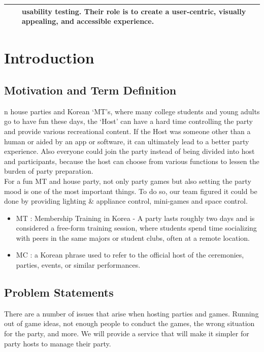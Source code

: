 \documentclass[conference]{IEEEtran}
\begin{document}
\begin{table}[htbp]
     \begin{tabular}{|p{1cm}|p{1.7cm}|p{5cm}|}
     \hline
     & &
    usability testing. Their role is to create a user-centric, visually appealing, and accessible experience.\\
     \hline
\end{tabular}
\end{table}

\section{Introduction}

    \subsection{Motivation and Term Definition}
        n house parties and Korean ‘MT’s, where many college students and young adults go to have fun these days, the ‘Host’ can  have a hard time controlling the party and provide various recreational content. If the Host was someone other than a human or aided by an app or software, it can ultimately lead to a better party experience. Also everyone could join the party instead of being divided into host and participants, because the host can choose from various functions to lessen the burden of party preparation.\\
    	For a fun MT and house party, not only party games but also setting the party mood is one of the most important things. To do so, our team figured it could be done by providing lighting \& appliance control, mini-games and space control.
        \begin{itemize}
            \item MT : Membership Training in Korea - A party lasts roughly two days and is considered a free-form training session, where students spend time socializing with peers in the same majors or student clubs, often at a remote location.
            \item MC : a Korean phrase used to refer to the official host of the ceremonies, parties, events, or similar performances.
        \end{itemize}

    \subsection{Problem Statements}
        There are a number of issues that arise when hosting parties and games. Running out of game ideas, not enough people to conduct the games, the wrong situation for the party, and more. We will provide a service that will make it simpler for party hosts to manage their party.
\end{document}
